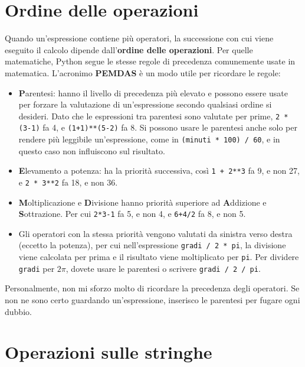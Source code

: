 \documentclass[10pt]{book}
\begin{document}
\section{Ordine delle operazioni}

Quando un'espressione contiene più operatori, la successione con cui viene eseguito il calcolo dipende dall'{\bf ordine delle operazioni}. Per quelle matematiche, Python segue le stesse regole di precedenza comunemente usate in matematica. L'acronimo {\bf PEMDAS} è un modo utile per ricordare le regole:

\begin{itemize}

\item {\bf P}arentesi: hanno il livello di precedenza più elevato e possono essere usate per forzare la valutazione di un'espressione secondo qualsiasi ordine si desideri. Dato che le espressioni tra parentesi sono valutate per prime, {\tt 2 * (3-1)} fa 4, e {\tt (1+1)**(5-2)} fa 8. Si possono usare le parentesi anche solo per rendere più leggibile un'espressione, come in {\tt (minuti * 100) / 60}, e in questo caso non influiscono sul risultato.

\item {\bf E}levamento a potenza: ha la priorità successiva, così
{\tt 1 + 2**3} fa 9, e non 27, e {\tt 2 * 3**2} fa 18, e non 36.

\item {\bf M}oltiplicazione e {\bf D}ivisione hanno priorità superiore ad {\bf A}ddizione e {\bf S}ottrazione. Per cui {\tt 2*3-1} fa 5, e non 4, e {\tt 6+4/2} fa 8, e non 5.

\item Gli operatori con la stessa priorità vengono valutati da sinistra verso destra (eccetto la potenza), per cui nell'espressione {\tt gradi / 2 * pi}, la divisione viene calcolata per prima e il risultato viene moltiplicato per {\tt pi}.  Per dividere {\tt gradi} per $2 \pi$, dovete usare le parentesi o scrivere {\tt gradi / 2 / pi}.

\end{itemize}

Personalmente, non mi sforzo molto di ricordare la precedenza degli operatori. Se non ne sono certo guardando un'espressione, inserisco le parentesi per fugare ogni dubbio.

\section{Operazioni sulle stringhe}
\end{document}

